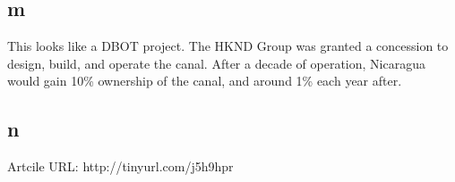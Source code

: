 \documentclass[12pt]{article} %
\begin{document}
	\subsection{m}
		This looks like a DBOT project. The HKND Group was granted a concession to design, build, and operate the canal. After a decade of operation, Nicaragua would gain 10\% ownership of the canal, and around 1\% each year after.
		
	\subsection{n}
		Artcile URL: http://tinyurl.com/j5h9hpr
		\newline
		
		
\end{document}
